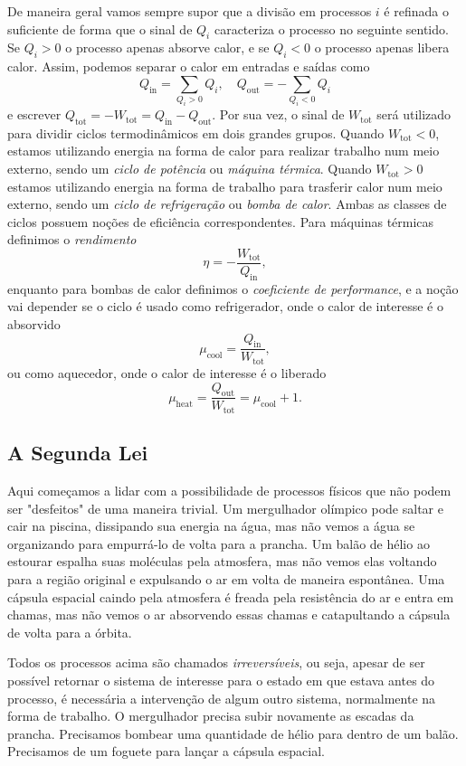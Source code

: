 De maneira geral vamos sempre supor que a divisão em processos $i$ é refinada o
suficiente de forma que o sinal de $Q_i$ caracteriza o processo no seguinte
sentido. Se $Q_i>0$ o processo apenas absorve calor, e se $Q_i<0$ o processo
apenas libera calor. Assim, podemos separar o calor em entradas e saídas como
$$Q_\text{in}=\sum_{Q_i>0}Q_i,\quad Q_\text{out}=-\sum_{Q_i<0}Q_i$$
e escrever $Q_\text{tot}=-W_\text{tot}=Q_\text{in}-Q_\text{out}$. Por sua vez, o
sinal de $W_\text{tot}$ será utilizado para dividir ciclos termodinâmicos em
dois grandes grupos. Quando $W_\text{tot}<0$, estamos utilizando energia na
forma de calor para realizar trabalho num meio externo, sendo um \emph{ciclo de 
potência} ou \emph{máquina térmica}. Quando $W_\text{tot}>0$ estamos
utilizando energia na forma de trabalho para trasferir calor num meio externo,
sendo um \emph{ciclo de refrigeração} ou \emph{bomba de calor}. Ambas as classes
de ciclos possuem noções de eficiência correspondentes. Para máquinas térmicas 
definimos o \emph{rendimento}
$$\eta=-\frac{W_\text{tot}}{Q_\text{in}},$$
enquanto para bombas de calor definimos o \emph{coeficiente de performance}, e a
noção vai depender se o ciclo é usado como refrigerador, onde o calor de
interesse é o absorvido
$$\mu_\text{cool}=\frac{Q_\text{in}}{W_\text{tot}},$$
ou como aquecedor, onde o calor de interesse é o liberado
$$\mu_\text{heat}=\frac{Q_\text{out}}{W_\text{tot}}=\mu_\text{cool}+1.$$

\subsection{A Segunda Lei}

Aqui começamos a lidar com a possibilidade de processos físicos que não podem
ser "desfeitos" de uma maneira trivial. Um mergulhador olímpico pode saltar e
cair na piscina, dissipando sua energia na água, mas não vemos a água se
organizando para empurrá-lo de volta para a prancha. Um balão de hélio ao
estourar espalha suas moléculas pela atmosfera, mas não vemos elas voltando para
a região original e expulsando o ar em volta de maneira espontânea. Uma cápsula
espacial caindo pela atmosfera é freada pela resistência do ar e entra em
chamas, mas não vemos o ar absorvendo essas chamas e catapultando a cápsula de
volta para a órbita. 

Todos os processos acima são chamados \emph{irreversíveis}, ou seja, apesar de
ser possível retornar o sistema de interesse para o estado em que estava antes
do processo, é necessária a intervenção de algum outro sistema, normalmente na
forma de trabalho. O mergulhador precisa subir novamente as escadas da prancha.
Precisamos bombear uma quantidade de hélio para dentro de um balão. Precisamos
de um foguete para lançar a cápsula espacial. 

